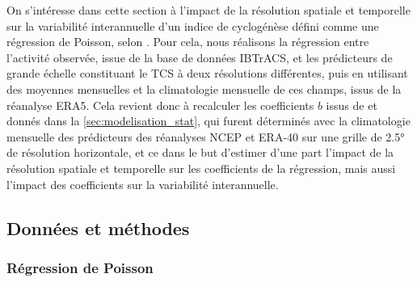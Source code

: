 \documentclass[../main.tex]{subfiles}
\begin{document}
On s'intéresse dans cette section à l'impact de la résolution spatiale et temporelle sur la variabilité interannuelle d'un indice de cyclogénèse défini comme
une régression de Poisson, selon \textcite{tippett_poisson_2011}. Pour cela, nous réalisons la régression entre l'activité observée, issue de la base de données
IBTrACS, et les prédicteurs de grande échelle constituant le TCS à deux résolutions différentes, puis en utilisant des moyennes mensuelles et la climatologie
mensuelle de ces champs, issus de la réanalyse ERA5. Cela revient donc à recalculer les coefficients $b$ issus de \textcite{tippett_poisson_2011} et donnés
dans la \cref{sec:modelisation_stat}, qui furent déterminés avec la climatologie mensuelle des prédicteurs des réanalyses NCEP
\parencite{kalnay_ncep_1996,kistler_ncep_2001} et ERA-40 \parencite{uppala_era40_2005} sur une grille de \ang{2.5} de résolution horizontale, et ce dans le but
d'estimer d'une part l'impact de la résolution spatiale et temporelle sur les coefficients de la régression, mais aussi l'impact des coefficients sur la
variabilité interannuelle.

\subsection{Données et méthodes}\label{sec:apport_res_methodes}

\subsubsection*{Régression de Poisson}\label{sec:regression_poisson}
\end{document}
